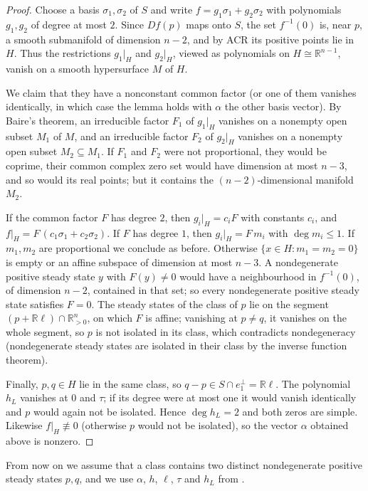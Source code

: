 \documentclass[11pt,a4paper]{report}
\providecommand{\R}{\mathbb{R}}
\newcommand{\Rpos}{\mathbb{R}_{>0}}
\begin{document}
\begin{proof}
Choose a basis $\sigma_1,\sigma_2$ of $S$ and write $f=g_1\sigma_1+g_2\sigma_2$ with polynomials $g_1,g_2$ of degree
at most $2$. Since $Df(p)$ maps onto $S$, the set $f^{-1}(0)$ is, near $p$, a smooth submanifold of dimension $n-2$,
and by ACR its positive points lie in~$H$. Thus the restrictions $g_1|_H$ and $g_2|_H$, viewed as polynomials on
$H\cong\R^{n-1}$, vanish on a smooth hypersurface $M$ of $H$.

We claim that they have a nonconstant common factor (or one of them vanishes identically, in which case the lemma
holds with $\alpha$ the other basis vector). By Baire's theorem, an irreducible factor $F_1$ of $g_1|_H$ vanishes on a
nonempty open subset $M_1$ of $M$, and an irreducible factor $F_2$ of $g_2|_H$ vanishes on a nonempty open subset
$M_2\subseteq M_1$. If $F_1$ and $F_2$ were not proportional, they would be coprime, their common complex zero set
would have dimension at most $n-3$, and so would its real points; but it contains the $(n-2)$-dimensional manifold
$M_2$.

If the common factor $F$ has degree $2$, then $g_i|_H=c_iF$ with constants $c_i$, and $f|_H=F\,(c_1\sigma_1+c_2\sigma_2)$.
If $F$ has degree $1$, then $g_i|_H=F\,m_i$ with $\deg m_i\le 1$. If $m_1,m_2$ are proportional we conclude as before.
Otherwise $\{x\in H\colon m_1=m_2=0\}$ is empty or an affine subspace of dimension at most $n-3$. A nondegenerate
positive steady state $y$ with $F(y)\neq 0$ would have a neighbourhood in $f^{-1}(0)$, of dimension $n-2$, contained
in that set; so every nondegenerate positive steady state satisfies $F=0$. The steady states of the class of $p$ lie
on the segment $(p+\R\ell)\cap\Rpos^n$, on which $F$ is affine; vanishing at $p\neq q$, it vanishes on the whole
segment, so $p$ is not isolated in its class, which contradicts nondegeneracy (nondegenerate steady states are
isolated in their class by the inverse function theorem).

Finally, $p,q\in H$ lie in the same class, so $q-p\in S\cap e_1^\perp=\R\ell$. The polynomial $h_L$ vanishes at $0$
and $\tau$; if its degree were at most one it would vanish identically and $p$ would again not be isolated. Hence
$\deg h_L=2$ and both zeros are simple. Likewise $f|_H\not\equiv0$ (otherwise $p$ would not be isolated), so the
vector $\alpha$ obtained above is nonzero.
\end{proof}

From now on we assume that a class contains two distinct nondegenerate positive steady states $p,q$, and we use
$\alpha$, $h$, $\ell$, $\tau$ and $h_L$ from .
\end{document}
